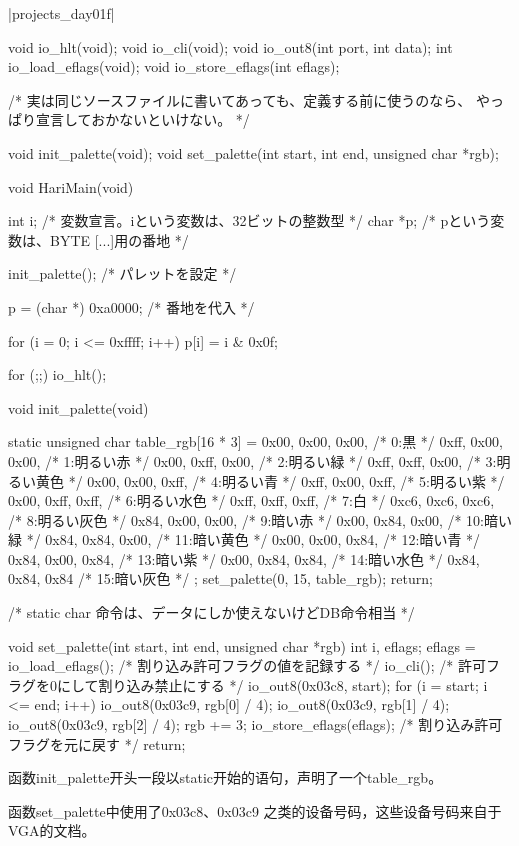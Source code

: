 \dag|projects_day\harib01f|
\begin{code}[label=bootpack.c]
void io_hlt(void);
void io_cli(void);
void io_out8(int port, int data);
int io_load_eflags(void);
void io_store_eflags(int eflags);

/* 実は同じソースファイルに書いてあっても、定義する前に使うのなら、
	やっぱり宣言しておかないといけない。 */

void init_palette(void);
void set_palette(int start, int end, unsigned char *rgb);

void HariMain(void)
{
	int i; /* 変数宣言。iという変数は、32ビットの整数型 */
	char *p; /* pという変数は、BYTE [...]用の番地 */

	init_palette(); /* パレットを設定 */

	p = (char *) 0xa0000; /* 番地を代入 */

	for (i = 0; i <= 0xffff; i++) {
		p[i] = i & 0x0f;
	}

	for (;;) {
		io_hlt();
	}
}

void init_palette(void)
{
	static unsigned char table_rgb[16 * 3] = {
		0x00, 0x00, 0x00,	/*  0:黒 */
		0xff, 0x00, 0x00,	/*  1:明るい赤 */
		0x00, 0xff, 0x00,	/*  2:明るい緑 */
		0xff, 0xff, 0x00,	/*  3:明るい黄色 */
		0x00, 0x00, 0xff,	/*  4:明るい青 */
		0xff, 0x00, 0xff,	/*  5:明るい紫 */
		0x00, 0xff, 0xff,	/*  6:明るい水色 */
		0xff, 0xff, 0xff,	/*  7:白 */
		0xc6, 0xc6, 0xc6,	/*  8:明るい灰色 */
		0x84, 0x00, 0x00,	/*  9:暗い赤 */
		0x00, 0x84, 0x00,	/* 10:暗い緑 */
		0x84, 0x84, 0x00,	/* 11:暗い黄色 */
		0x00, 0x00, 0x84,	/* 12:暗い青 */
		0x84, 0x00, 0x84,	/* 13:暗い紫 */
		0x00, 0x84, 0x84,	/* 14:暗い水色 */
		0x84, 0x84, 0x84	/* 15:暗い灰色 */
	};
	set_palette(0, 15, table_rgb);
	return;

	/* static char 命令は、データにしか使えないけどDB命令相当 */
}

void set_palette(int start, int end, unsigned char *rgb)
{
	int i, eflags;
	eflags = io_load_eflags();	/* 割り込み許可フラグの値を記録する */
	io_cli(); 					/* 許可フラグを0にして割り込み禁止にする */
	io_out8(0x03c8, start);
	for (i = start; i <= end; i++) {
		io_out8(0x03c9, rgb[0] / 4);
		io_out8(0x03c9, rgb[1] / 4);
		io_out8(0x03c9, rgb[2] / 4);
		rgb += 3;
	}
	io_store_eflags(eflags);	/* 割り込み許可フラグを元に戻す */
	return;
}
\end{code}

函数init\_palette开头一段以static开始的语句，声明了一个table\_rgb。

函数set\_palette中使用了0x03c8、0x03c9 之类的设备号码，这些设备号码来自于VGA的文档。

